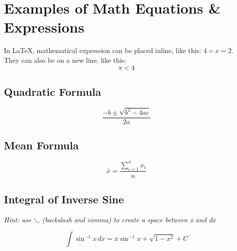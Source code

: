 \section{Examples of Math Equations \& Expressions}

In LaTeX, mathematical expression can be placed inline, like this: \(4 \div x  = 2\). They can also be on a new line, like this: \[\pi < 4\]

\subsection{Quadratic Formula}

\[\frac{-b \pm \sqrt{b^{2} - 4ac}}{2a}\]

\subsection{Mean Formula}

\[\bar{x} = \frac{\sum_{i=1}^{n} x_i}{n}\]

\subsection{Integral of Inverse Sine}

\textit{Hint: use $\backslash$, (backslash and comma) to create a space between x and dx}

\[\int \sin^{-1}x\,dx = x\sin^{-1}x + \sqrt{1-x^{2}} + C \]

